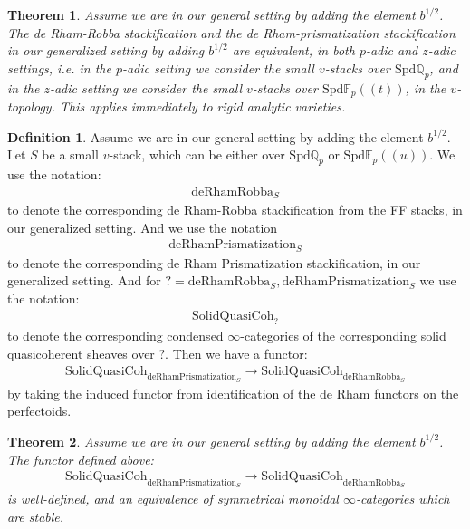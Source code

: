 \documentclass[12pt]{article}
\newtheorem{theorem}{Theorem}
\theoremstyle{definition}
\newtheorem{definition}{Definition}
\begin{document}
\begin{theorem}
Assume we are in our general setting by adding the element $b^{1/2}$. The de Rham-Robba stackification and the de Rham-prismatization stackification in our generalized setting by adding $b^{1/2}$ are equivalent, in both $p$-adic and $z$-adic settings, i.e. in the $p$-adic setting we consider the small $v$-stacks over $\mathrm{Spd}\mathbb{Q}_p$, and in the $z$-adic setting we consider the small $v$-stacks over $\mathrm{Spd}\mathbb{F}_p((t))$, in the $v$-topology. This applies immediately to rigid analytic varieties.
\end{theorem}


\begin{definition}
Assume we are in our general setting by adding the element $b^{1/2}$. Let $S$ be a small $v$-stack, which can be either over $\mathrm{Spd}\mathbb{Q}_p$ or $\mathrm{Spd}\mathbb{F}_p((u))$. We use the notation:
\begin{align}
\mathrm{deRhamRobba}_S
\end{align}
to denote the corresponding de Rham-Robba stackification from the FF stacks, in our generalized setting. And we use the notation
\begin{align}
\mathrm{deRhamPrismatization}_S
\end{align}
to denote the corresponding de Rham Prismatization stackification, in our generalized setting. And for $?= \mathrm{deRhamRobba}_S, \mathrm{deRhamPrismatization}_S$ we use the notation:
\begin{align}
\mathrm{SolidQuasiCoh}_?
\end{align}
to denote the corresponding condensed $\infty$-categories of the corresponding solid quasicoherent sheaves over $?$. Then we have a functor:
\begin{align}
\mathrm{SolidQuasiCoh}_{\mathrm{deRhamPrismatization}_S}\rightarrow \mathrm{SolidQuasiCoh}_{\mathrm{deRhamRobba}_S}
\end{align}
by taking the induced functor from identification of the de Rham functors on the perfectoids.
\end{definition}


\begin{theorem}
Assume we are in our general setting by adding the element $b^{1/2}$. The functor defined above:
\begin{align}
\mathrm{SolidQuasiCoh}_{\mathrm{deRhamPrismatization}_S}\rightarrow \mathrm{SolidQuasiCoh}_{\mathrm{deRhamRobba}_S}
\end{align}
is well-defined, and an equivalence of symmetrical monoidal $\infty$-categories which are stable.

\end{theorem}
\end{document}
